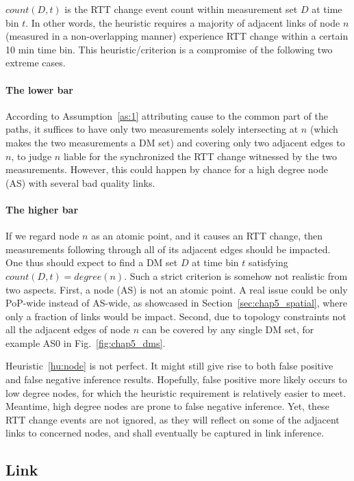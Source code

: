 $count(D,t)$ is the RTT change event count within measurement set $D$ at time bin $t$. In other words, the heuristic requires a majority of adjacent links of node $n$ (measured in a non-overlapping manner) experience RTT change within a certain 10 min time bin. This heuristic/criterion is a compromise of the following two extreme cases.

\paragraph{The lower bar} According to Assumption~\ref{as:1} attributing cause to the common part of the paths, it suffices to have only two measurements solely intersecting at $n$ (which makes the two measurements a \ac{DM} set) and covering only two adjacent edges to $n$, to judge $n$ liable for the synchronized the RTT change witnessed by the two measurements. However, this could happen by chance for a high degree node (AS) with several bad quality links.

\paragraph{The higher bar} If we regard node $n$ as an atomic point, and it causes an RTT change, then measurements following through all of its adjacent edges should be impacted. One thus should expect to find a \ac{DM} set $D$ at time bin $t$ satisfying $count(D, t) = degree(n)$. Such a strict criterion is somehow not realistic from two aspects. First, a node (AS) is not an atomic point. A real issue could be only PoP-wide instead of AS-wide, as showcased in Section~\ref{sec:chap5_spatial}, where only a fraction of links would be impact. Second, due to topology constraints not all the adjacent edges of node $n$ can be covered by any single \ac{DM} set, for example AS0 in Fig.~\ref{fig:chap5_dms}.

Heuristic~\ref{hu:node} is not perfect. It might still give rise to both false positive and false negative inference results. Hopefully, false positive more likely occurs to low degree nodes, for which the heuristic requirement is relatively easier to meet. Meantime, high degree nodes are prone to false negative inference. Yet, these RTT change events are not ignored, as they will reflect on some of the adjacent links to concerned nodes, and shall eventually be captured in link inference.

\subsection{Link}


